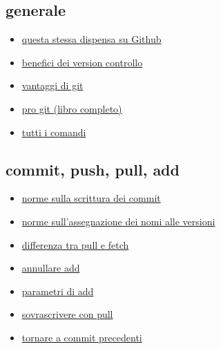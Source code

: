 \documentclass{article} \usepackage[textwidth=19cm,textheight=24cm]{geometry}
\begin{document}
\subsection{generale}
\begin{itemize}
    \item \href{https://github.com/Stivvo/GitNoob2Pro}
        {questa stessa dispensa su Github}
    \item \href{https://www.atlassian.com/git/tutorials/what-is-version-control}
        {benefici dei version controllo}
    \item \href{https://git-scm.com/about/branching-and-merging}
        {vantaggi di git}
    \item \href{https://git-scm.com/book/en/v2}
        {pro git (libro completo)}
    \item \href{https://git-scm.com/doc}
        {tutti i comandi}
\end{itemize}

\subsection{commit, push, pull, add}
\begin{itemize}
    \item \href{https://chris.beams.io/posts/git-commit/}{norme sulla scrittura dei commit}
    \item \href{https://semver.org/}{norme sull'assegnazione dei nomi alle versioni}
    \item \href{https://stackoverflow.com/questions/292357/what-is-the-difference-between-git-pull-and-git-fetch}
        {differenza tra pull e fetch}
    \item \href{https://stackoverflow.com/questions/348170/how-do-i-undo-git-add-before-commit?rq=1}
        {annullare add}
    \item \href{https://stackoverflow.com/questions/572549/difference-between-git-add-a-and-git-add?rq=1}
        {parametri di add}
    \item \href{https://stackoverflow.com/questions/1125968/how-do-i-force-git-pull-to-overwrite-local-files?rq=1}
        {sovrascrivere con pull}
    \item \href{https://stackoverflow.com/questions/4114095/how-do-i-revert-a-git-repository-to-a-previous-commit?rq=1}
        {tornare a commit precedenti}
\end{itemize}
\end{document}
